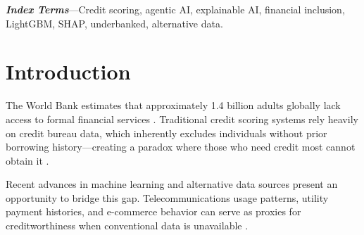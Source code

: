 \documentclass[12pt,a4paper]{article}
\begin{document}
\thispagestyle{empty}
\newpage
{}
\tableofcontents
\newpage

\begin{abstract}
Approximately 1.4 billion adults worldwide remain unbanked, lacking access to formal credit due to the absence of traditional credit bureau history. This paper proposes an Agentic AI-powered credit scoring system that leverages alternative data sources---telecommunications, utility payments, and e-commerce activity---to assess creditworthiness for underbanked populations. The system integrates a LightGBM classifier achieving 0.786 AUC with SHAP-based explainability, an autonomous AI advisory agent that provides personalized credit assessments through multi-step reasoning and interactive consultation, and a FICO-compatible scoring framework (300--850). The proposed architecture employs AWS cloud services including Amazon SageMaker, AWS Lambda, and Amazon Bedrock to enable scalable, production-ready deployment. The agentic component autonomously analyzes applicant profiles, generates risk explanations, suggests improvement actions, and engages in multi-turn advisory conversations---demonstrating true autonomous decision support in financial services.
\end{abstract}

\noindent\textbf{\textit{Index Terms}}---Credit scoring, agentic AI, explainable AI, financial inclusion, LightGBM, SHAP, underbanked, alternative data.

\vspace{1em}

\section{Introduction}

The World Bank estimates that approximately 1.4 billion adults globally lack access to formal financial services \cite{worldbank2021}. Traditional credit scoring systems rely heavily on credit bureau data, which inherently excludes individuals without prior borrowing history---creating a paradox where those who need credit most cannot obtain it \cite{fico2020}.

Recent advances in machine learning and alternative data sources present an opportunity to bridge this gap. Telecommunications usage patterns, utility payment histories, and e-commerce behavior can serve as proxies for creditworthiness when conventional data is unavailable \cite{bjorkegren2019}.
\end{document}
